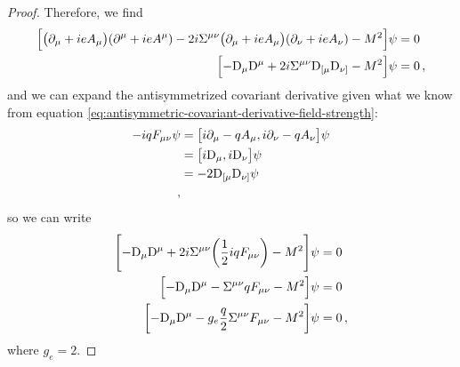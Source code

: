 \documentclass[main.tex]{subfiles}
\begin{document}
\begin{proof}
Therefore, we find 
%
\begin{subequations}
\begin{align}
\qty[\qty(\partial_{\mu } + i e A_{\mu }) \qty(\partial^{\mu } + i e A^{\mu }) - 2i \Sigma^{\mu \nu } \qty(\partial_{\mu } +ieA_{\mu }) \qty(\partial_{\nu } + ieA_{\nu }) - M^2] \psi &= 0  \\
\qty[-\mathrm{D}_{\mu } \mathrm{D}^{\mu} + 2i \Sigma^{\mu \nu } \mathrm{D}_{[\mu } \mathrm{D}_{\nu ]}  - M^2] \psi &= 0
\,,
\end{align}
\end{subequations}
%
and we can expand the antisymmetrized covariant derivative given what we know from equation \eqref{eq:antisymmetric-covariant-derivative-field-strength}: 
%
\begin{subequations}
\begin{align}
-iq F_{\mu \nu } \psi &=
\qty[i \partial_{\mu } - q A_{\mu}, i \partial_{\nu } - q A_{\nu }] \psi \\
&= \qty[i \mathrm{D}_{\mu }, i \mathrm{D}_{\nu }]\psi  \\
&= - 2 \mathrm{D}_{[\mu } \mathrm{D}_{\nu ]} \psi  \\
\,,
\end{align}
\end{subequations}
%
so we can write 
%
\begin{subequations}
\begin{align}
\qty[-\mathrm{D}_{\mu } \mathrm{D}^{\mu} + 2i \Sigma^{\mu \nu } \qty(\frac{1}{2} iq F_{\mu \nu }) - M^2] \psi &= 0  \\
\qty[-\mathrm{D}_{\mu } \mathrm{D}^{\mu} - \Sigma^{\mu \nu }  q F_{\mu \nu } - M^2] \psi &= 0  \\
\qty[-\mathrm{D}_{\mu } \mathrm{D}^{\mu} - g_e \frac{q}{2} \Sigma^{\mu \nu }  F_{\mu \nu } - M^2] \psi &= 0 
\,,
\end{align}
\end{subequations}
where \(g_e = 2\). 
\end{proof}
\end{document}
